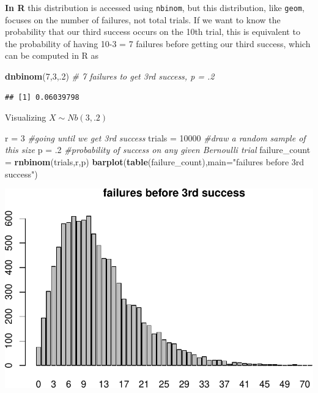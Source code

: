 \documentclass[
]{book}
\newenvironment{Shaded}{\begin{snugshade}}{\end{snugshade}}
\newcommand{\AttributeTok}[1]{\textcolor[rgb]{0.13,0.29,0.53}{#1}}
\newcommand{\CommentTok}[1]{\textcolor[rgb]{0.56,0.35,0.01}{\textit{#1}}}
\newcommand{\DecValTok}[1]{\textcolor[rgb]{0.00,0.00,0.81}{#1}}
\newcommand{\FunctionTok}[1]{\textcolor[rgb]{0.13,0.29,0.53}{\textbf{#1}}}
\newcommand{\NormalTok}[1]{#1}
\newcommand{\OtherTok}[1]{\textcolor[rgb]{0.56,0.35,0.01}{#1}}
\newcommand{\StringTok}[1]{\textcolor[rgb]{0.31,0.60,0.02}{#1}}
\theoremstyle{definition}
\theoremstyle{definition}
\theoremstyle{definition}
\theoremstyle{definition}
\theoremstyle{remark}
\begin{document}
\textbf{In R} this distribution is accessed using \texttt{nbinom}, but this distribution, like \texttt{geom}, focuses on the number of failures, not total trials. If we want to know the probability that our third success occurs on the 10th trial, this is equivalent to the probability of having 10-3 = 7 failures before getting our third success, which can be computed in R as

\begin{Shaded}
\begin{Highlighting}[]
\FunctionTok{dnbinom}\NormalTok{(}\DecValTok{7}\NormalTok{,}\DecValTok{3}\NormalTok{,.}\DecValTok{2}\NormalTok{) }\CommentTok{\# 7 failures to get 3rd success, p = .2}
\end{Highlighting}
\end{Shaded}

\begin{verbatim}
## [1] 0.06039798
\end{verbatim}

Visualizing \(X \sim Nb(3,.2)\)

\begin{Shaded}
\begin{Highlighting}[]
\NormalTok{r }\OtherTok{=} \DecValTok{3} \CommentTok{\#going until we get 3rd success}
\NormalTok{trials }\OtherTok{=} \DecValTok{10000} \CommentTok{\#draw a random sample of this size}
\NormalTok{p }\OtherTok{=}\NormalTok{ .}\DecValTok{2} \CommentTok{\#probability of success on any given Bernoulli trial}
\NormalTok{failure\_count }\OtherTok{=} \FunctionTok{rnbinom}\NormalTok{(trials,r,p)}
\FunctionTok{barplot}\NormalTok{(}\FunctionTok{table}\NormalTok{(failure\_count),}\AttributeTok{main=}\StringTok{"failures before 3rd success"}\NormalTok{)}
\end{Highlighting}
\end{Shaded}

\includegraphics{math340-notes_files/figure-latex/unnamed-chunk-154-1.pdf}
\end{document}
